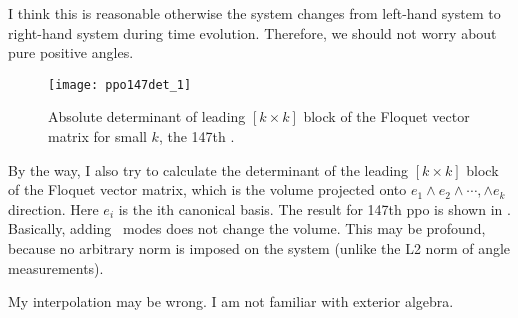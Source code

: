 \begin{description}
I think this is reasonable otherwise the system changes from
left-hand system to right-hand system during time evolution.
Therefore, we should not worry about pure positive angles.

\begin{figure}[h]
    \centering
    \texttt{[image: ppo147det\_1]}
    \caption{Absolute determinant of leading $[k\times k]$ block
    of the Floquet vector matrix for small $k$, the 147th \ppo.
    }
    \label{fig:ppo147what}
  \end{figure}


By the way, I also try to calculate the determinant of the leading
$[k\times k]$ block of the Floquet vector matrix, which is the
volume projected onto $e_1 \wedge e_2\wedge \cdots, \wedge e_k$
direction. Here $e_i$ is the ith canonical basis. The result
for 147th ppo is shown in . Basically, adding
\transient\ modes does not change the volume. This may be profound,
because no arbitrary norm is imposed on the system (unlike the L2 norm
of angle measurements).

My interpolation may be wrong. I am not familiar with exterior algebra.


\end{description}
